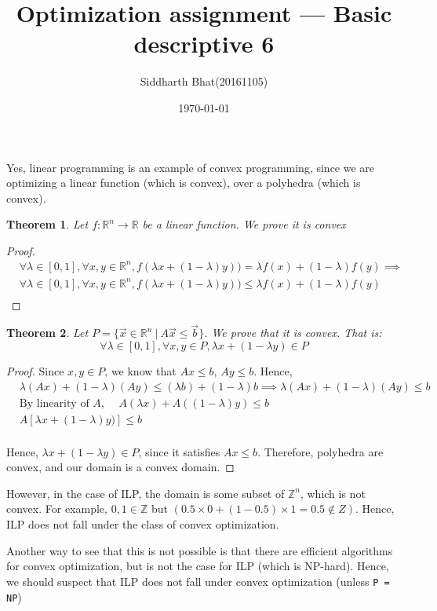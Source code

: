 \documentclass[9pt]{article}
\author{Siddharth Bhat(20161105)}
\title{Optimization assignment --- Basic descriptive 6}
\date{\today}
\newtheorem{theorem}{Theorem}
\newcommand{\Z}{\mathbb{Z}}
\newcommand{\R}{\mathbb{R}}
\begin{document}
\maketitle
\thispagestyle{fancy}
Yes, linear programming is an example of convex programming, since 
we are optimizing a linear function (which is convex), over a polyhedra
(which is convex).
\begin{theorem}
    Let $f: \R^n \rightarrow \R$ be a linear function. We prove it is convex
\end{theorem}
\begin{proof}
    \begin{align*}
    &\forall \lambda \in [0, 1], \forall x, y \in \R^n, f(\lambda x + (1 - \lambda) y)) = \lambda f(x) + (1 - \lambda) f(y) \implies \\
    &\forall \lambda \in [0, 1], \forall x, y \in \R^n, f(\lambda x + (1 - \lambda) y)) \leq \lambda f(x) + (1 - \lambda) f(y) \\
    \end{align*}
\end{proof}

\begin{theorem}
    Let $P = \{ \vec x \in \R^n ~|~ A \vec x \leq \vec b \}$.  We prove
    that it is convex. That is:
    \[ \forall \lambda \in [0, 1], \forall x, y \in P, \lambda x + (1 - \lambda y) \in P \]
\end{theorem}
\begin{proof}
    Since $x, y \in P$, we know that $Ax \leq b$, $Ay \leq b$. Hence,
    \begin{align*}
        &\lambda (Ax) + (1 - \lambda) (Ay) \leq (\lambda b) + (1 - \lambda) b \implies \lambda (Ax) + (1 - \lambda) (Ay) \leq b \\
        &\text{By linearity of $A$, } \quad A (\lambda x) + A ((1 - \lambda) y) \leq b \\
        &A [\lambda x + (1 - \lambda) y)] \leq b \\
    \end{align*}

    Hence, $\lambda x + (1 - \lambda y) \in P$, since it satisfies $Ax \leq b$.
    Therefore, polyhedra are convex, and our domain is a convex domain.
\end{proof}

However, in the case of ILP, the domain is some subset of $\Z^n$, which 
is not convex. For example, $0, 1 \in \Z$ but $(0.5 \times 0 + (1 - 0.5) \times 1 = 0.5 \notin Z)$.
Hence, ILP does not fall under the class of convex optimization.

Another way to see that this is not possible is that there are efficient
algorithms for convex optimization, but is not the case for ILP (which is
NP-hard). Hence, we should suspect that ILP does not fall under
convex optimization (unless \texttt{P = NP})
\end{document}
